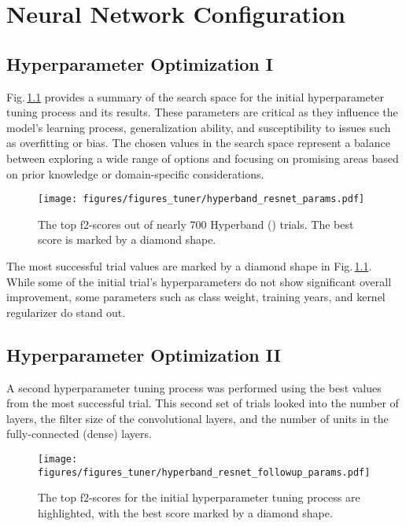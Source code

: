 \chapter{Neural Network Configuration}
\label{chapter:hyper}
\section{Hyperparameter Optimization I}

Fig.\,\ref{fig:hyperband_resnet_params} provides a summary of the search space for the initial hyperparameter tuning process and its results. These parameters are critical as they influence the model's learning process, generalization ability, and susceptibility to issues such as overfitting or bias. The chosen values in the search space represent a balance between exploring a wide range of options and focusing on promising areas based on prior knowledge or domain-specific considerations.

\begin{figure}[ht]
    \centering
    \texttt{[image: figures/figures\_tuner/hyperband\_resnet\_params.pdf]}
    \caption{The top f2-scores out of nearly 700 Hyperband (\cite{hyperband}) trials. The best score is marked by a diamond shape.}
    \label{fig:hyperband_resnet_params}
\end{figure}

The most successful trial values are marked by a diamond shape in Fig.\,\ref{fig:hyperband_resnet_params}. While some of the initial trial's hyperparameters do not show significant overall improvement, some parameters such as class weight, training years, and kernel regularizer do stand out. 

\section{Hyperparameter Optimization II}

A second hyperparameter tuning process was performed using the best values from the most successful trial. This second set of trials looked into the number of layers, the filter size of the convolutional layers, and the number of units in the fully-connected (dense) layers. 

\begin{figure}[ht]
    \centering
    \texttt{[image: figures/figures\_tuner/hyperband\_resnet\_followup\_params.pdf]}
    \caption{The top f2-scores for the initial hyperparameter tuning process are highlighted, with the best score marked by a diamond shape.}
    \label{fig:hyperband_resnet_followup_params}
\end{figure}

